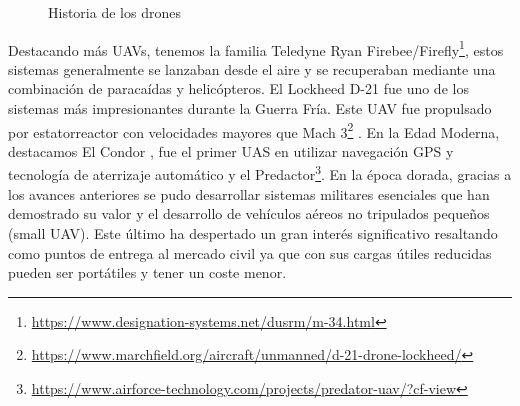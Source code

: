 \begin{figure}[H]
  \begin{center}
  \caption{Historia de los drones}
  \label{f:Drones}
  \vspace{-1.5em}
  \end{center}
 \end{figure}

Destacando más UAVs, tenemos la familia Teledyne Ryan Firebee/Firefly\footnote{\url{https://www.designation-systems.net/dusrm/m-34.html}}, estos sistemas generalmente se lanzaban 
desde el aire y se recuperaban mediante una combinación de paracaídas y helicópteros. El Lockheed D-21 fue uno de los sistemas más impresionantes durante la Guerra Fría. 
Este UAV fue propulsado por estatorreactor con velocidades mayores que Mach 3\footnote{\url{https://www.marchfield.org/aircraft/unmanned/d-21-drone-lockheed/}} . 
En la Edad Moderna, destacamos El Condor \cite{CondorUAV}, fue el primer UAS en utilizar navegación GPS y tecnología de aterrizaje automático y el Predactor\footnote{\url{https://www.airforce-technology.com/projects/predator-uav/?cf-view}}. 
En la época dorada, gracias a los avances anteriores se pudo desarrollar sistemas militares esenciales que han demostrado su valor y el desarrollo de vehículos aéreos no 
tripulados pequeños (small UAV). Este último ha despertado un gran interés significativo resaltando como puntos de entrega al mercado civil ya que con sus cargas útiles
reducidas pueden ser portátiles y tener un coste menor. 

